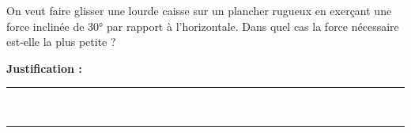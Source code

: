 On veut faire glisser une lourde caisse sur un plancher rugueux en exerçant une force inclinée de \ang{30} par rapport à l'horizontale. Dans quel cas la force nécessaire est-elle la plus petite ?

\choices

\noindent\textbf{Justification :} \hrulefill \\[2.5ex]
\rule{\linewidth}{0.4pt} \\[2.5ex]
\rule{\linewidth}{0.4pt}
\vfill
